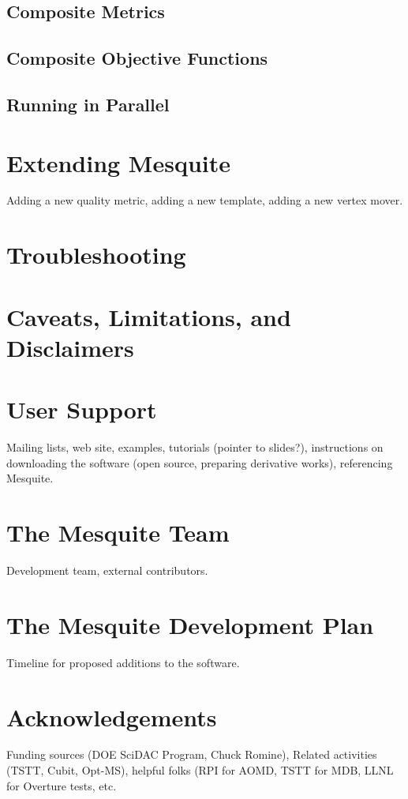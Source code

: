 \subsection{Composite Metrics}

\subsection{Composite Objective Functions}

\subsection{Running in Parallel}

\section{Extending Mesquite}
Adding a new quality metric, adding a new template, adding a new vertex 
mover.

\section{Troubleshooting}

\section{Caveats, Limitations, and Disclaimers}

\section{User Support}
Mailing lists, web site, examples, tutorials (pointer to slides?), 
instructions on downloading the software (open source, preparing 
derivative works), referencing Mesquite.

\section{The Mesquite Team}
Development team, external contributors.

\section{The Mesquite Development Plan}
Timeline for proposed additions to the software.

\section{Acknowledgements}
Funding sources (DOE SciDAC Program, Chuck Romine), Related activities 
(TSTT, Cubit, Opt-MS), helpful folks (RPI for AOMD, TSTT for MDB, 
LLNL for Overture tests, etc.

